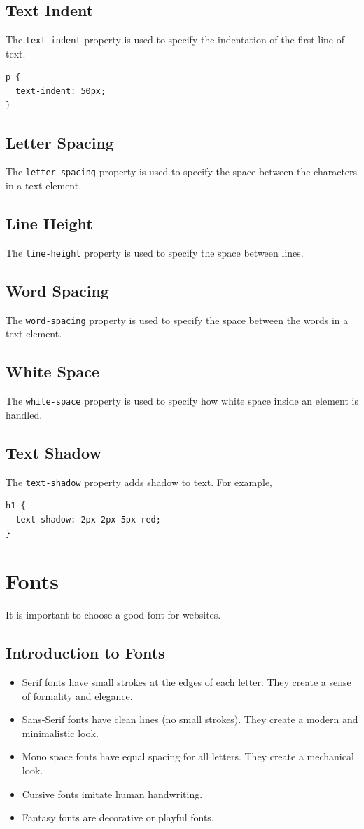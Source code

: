 \documentclass{thomasClass}
\begin{document}
\subsection{Text Indent}
The \verb|text-indent| property is used to specify the indentation of the first line of text.
\begin{Verbatim}[breaklines=true, breakanywhere=true]
p {
  text-indent: 50px;
}
\end{Verbatim}
\subsection{Letter Spacing}
The \verb|letter-spacing| property is used to specify the space between the characters in a text element.
\subsection{Line Height}
The \verb|line-height| property is used to specify the space between lines.
\subsection{Word Spacing}
The \verb|word-spacing| property is used to specify the space between the words in a text element.
\subsection{White Space}
The \verb|white-space| property is used to specify how white space inside an element is handled.
\subsection{Text Shadow}
The \verb|text-shadow| property adds shadow to text. For example,
\begin{Verbatim}[breaklines=true, breakanywhere=true]
h1 {
  text-shadow: 2px 2px 5px red;
}
\end{Verbatim}

\section{Fonts}
It is important to choose a good font for websites. 
\subsection{Introduction to Fonts}
\begin{itemize}
    \item Serif fonts have small strokes at the edges of each letter. They create a sense of formality and elegance.
    \item Sans-Serif fonts have clean lines (no small strokes). They create a modern and minimalistic look.
    \item Mono space fonts have equal spacing for all letters. They create a mechanical look.
    \item Cursive fonts imitate human handwriting.
    \item Fantasy fonts are decorative or playful fonts.
\end{itemize}
\end{document}
